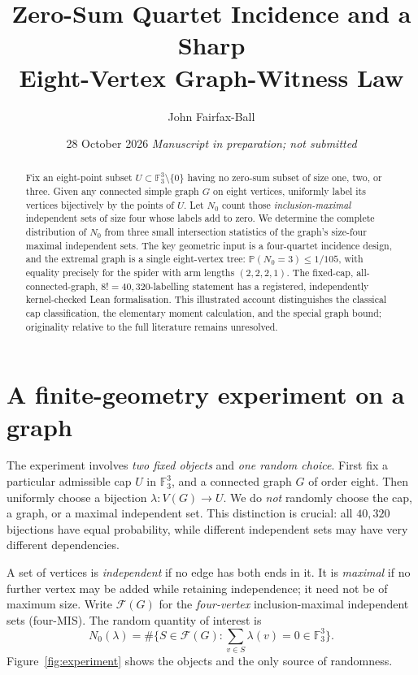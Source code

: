 \documentclass[12pt,a4paper]{article}
\title{\bfseries Zero-Sum Quartet Incidence and a Sharp\\[4pt] Eight-Vertex Graph-Witness Law}
\author{John Fairfax-Ball}
\date{28 October 2026 \quad\textit{Manuscript in preparation; not submitted}}
\newcommand{\F}{\mathbb F}
\newcommand{\cF}{\mathcal F}
\newcommand{\PP}{\mathbb P}
\begin{document}
\maketitle
\begin{abstract}
Fix an eight-point subset $U\subset\F_3^3\setminus\{0\}$ having no zero-sum subset of size one, two, or three. Given any connected simple graph $G$ on eight vertices, uniformly label its vertices bijectively by the points of $U$. Let $N_0$ count those \emph{inclusion-maximal} independent sets of size four whose labels add to zero. We determine the complete distribution of $N_0$ from three small intersection statistics of the graph's size-four maximal independent sets. The key geometric input is a four-quartet incidence design, and the extremal graph is a single eight-vertex tree: $\PP(N_0=3)\le 1/105$, with equality precisely for the spider with arm lengths $(2,2,2,1)$. The fixed-cap, all-connected-graph, $8!=40{,}320$-labelling statement has a registered, independently kernel-checked Lean formalisation. This illustrated account distinguishes the classical cap classification, the elementary moment calculation, and the special graph bound; originality relative to the full literature remains unresolved.
\end{abstract}

\section{A finite-geometry experiment on a graph}\label{sec:intro}
The experiment involves \emph{two fixed objects} and \emph{one random choice}. First fix a particular admissible cap $U$ in $\F_3^3$, and a connected graph $G$ of order eight. Then uniformly choose a bijection $\lambda:V(G)\to U$. We do \emph{not} randomly choose the cap, a graph, or a maximal independent set. This distinction is crucial: all $40{,}320$ bijections have equal probability, while different independent sets may have very different dependencies.

A set of vertices is \emph{independent} if no edge has both ends in it. It is \emph{maximal} if no further vertex may be added while retaining independence; it need not be of maximum size. Write $\cF(G)$ for the \emph{four-vertex} inclusion-maximal independent sets (four-MIS). The random quantity of interest is
\[
 N_0(\lambda)=\#\bigl\{S\in\cF(G): \sum_{v\in S}\lambda(v)=0\in\F_3^3\bigr\}.
\]
Figure~\ref{fig:experiment} shows the objects and the only source of randomness.
\end{document}

